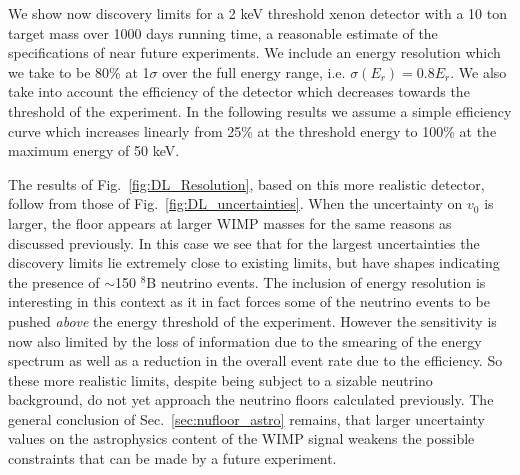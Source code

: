 We show now discovery limits for a 2 keV threshold xenon detector with a 10 ton target mass over 1000 days running time, a reasonable estimate of the specifications of near future experiments. We include an energy resolution which we take to be 80\% at 1$\sigma$ over the full energy range, i.e. $\sigma(E_r) = 0.8 E_r$. We also take into account the efficiency of the detector which decreases towards the threshold of the experiment. In the following results we assume a simple efficiency curve which increases linearly from 25\% at the threshold energy to 100\% at the maximum energy of 50 keV.

The results of Fig.~\ref{fig:DL_Resolution}, based on this more realistic detector, follow from those of Fig.~\ref{fig:DL_uncertainties}. When the uncertainty on $v_0$ is larger, the floor appears at larger WIMP masses for the same reasons as discussed previously. In this case we see that for the largest uncertainties the discovery limits lie extremely close to existing limits, but have shapes indicating the presence of $\sim$150 $^8$B neutrino events. The inclusion of energy resolution is interesting in this context as it in fact forces some of the neutrino events to be pushed {\it above} the energy threshold of the experiment. However the sensitivity is now also limited by the loss of information due to the smearing of the energy spectrum as well as a reduction in the overall event rate due to the efficiency. So these more realistic limits, despite being subject to a sizable neutrino background, do not yet approach the neutrino floors calculated previously. The general conclusion of Sec.~\ref{sec:nufloor_astro} remains, that larger uncertainty values on the astrophysics content of the WIMP signal weakens the possible constraints that can be made by a future experiment.




